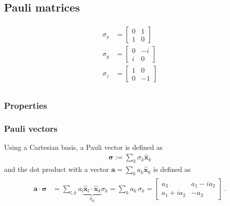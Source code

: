 \documentclass[letterpaper,10pt,english]{jupyterBook}
\begin{document}
\subsection{Pauli matrices}
\label{\detokenize{ch/quantum-mechanics/angular-momentum/angular-momentum-spin:pauli-matrices}}\label{\detokenize{ch/quantum-mechanics/angular-momentum/angular-momentum-spin:quantum-mechanics-angular-momentum-spin-pauli-matrices}}\begin{equation*}
\begin{split}\begin{aligned}
 \sigma_x & = \begin{bmatrix} 0 &  1 \\ 1 &  0 \end{bmatrix} \\
 \sigma_y & = \begin{bmatrix} 0 & -i \\ i &  0 \end{bmatrix} \\
 \sigma_z & = \begin{bmatrix} 1 &  0 \\ 0 & -1 \end{bmatrix} \\
\end{aligned}\end{split}
\end{equation*}

\subsubsection{Properties}
\label{\detokenize{ch/quantum-mechanics/angular-momentum/angular-momentum-spin:properties}}

\subsubsection{Pauli vectors}
\label{\detokenize{ch/quantum-mechanics/angular-momentum/angular-momentum-spin:pauli-vectors}}
\sphinxAtStartPar
Using a Cartesian basis, a Pauli vector is defined as
\begin{equation*}
\begin{split}\boldsymbol\sigma := \sum_k \sigma_k \hat{\mathbf{x}}_k\end{split}
\end{equation*}
\sphinxAtStartPar
and the dot product with a vector \(\mathbf{a} = \sum_k a_k \hat{\mathbf{x}}_k\) is defined as
\begin{equation*}
\begin{split}\begin{aligned}
 \mathbf{a} \cdot \boldsymbol\sigma 
 & = \sum_{l,k} a_l \underbrace{\hat{\mathbf{x}}_l \cdot \hat{\mathbf{x}}_k}_{\delta_{kl}} \sigma_k = \sum_k a_k \, \sigma_k
   = \begin{bmatrix} a_3 & a_1 - i a_2 \\ a_1 + i a_2 & - a_3 \end{bmatrix} \ .
\end{aligned}\end{split}
\end{equation*}
\end{document}
